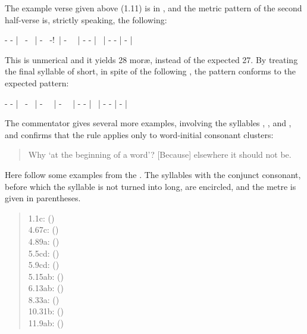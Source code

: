 \noindent
The example verse given above (1.11) is in , and the
metric pattern of the second half-verse is, strictly speaking, the following:
 
- - | \shortsyllable\ - \shortsyllable\ | - \shortsyllable\ -!~| 
- \shortsyllable\ \shortsyllable\ | 
- - | \shortsyllable\ | -  - | - |

This is unmerical and it yields 28 mor\ae, instead 
of the expected 27. By treating the final syllable of  short, 
in spite of the following , the pattern conforms 
to the expected pattern: 

- - | \shortsyllable\ - \shortsyllable\ | 
- \shortsyllable\ \shortsyllable\ | - \shortsyllable\ \shortsyllable\ | - - | 
\shortsyllable\ | - - | - |

The commentator gives several more examples, involving the syllables
, , and , and confirms that the rule
applies only to word-initial consonant clusters: 

\begin{quote}
{\footnotesize{}

Why `at the beginning of a word'? [Because] elsewhere it should not be.}
\end{quote}

\noindent
Here follow some examples from the \VSS. The syllables 
with the  conjunct consonant, before which the syllable 
is not turned into long, are encircled, and the metre is given in 
parentheses.

\begin{quote}	
1.1c:  ()\\
4.67c:  ()\\
4.89a:  ()\\
5.5cd:  ()\\
5.9cd:   ()\\
5.15ab:  ()\\
6.13ab:  ()\\
8.33a:  
 ()\\
10.31b:  ()\\
11.9ab:  ()
\end{quote}

